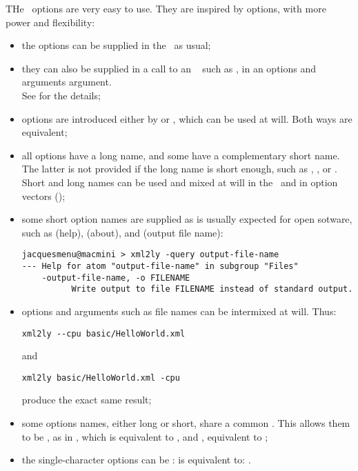 THe \oahRepr\ options are very easy to use. They are inspired by  options, with more power and flexibility:
\begin{itemize}
\item the options can be supplied in the \CLI\ as usual;

  \item they can also be supplied in a call to an \API\  such as , in an options and arguments argument. \\
    		See  for the details;

\item options are introduced either by \code{-} or \code{--}, which can be used at will. Both ways are equivalent;

\item all options have a long name, and some have a complementary short name.
 The latter is not provided if the long name is short enough, such as , ,  or .\\
    Short and long names can be used and mixed at will in the \CLI\ and in option vectors (\API);

\item some short option names are supplied as is usually expected for open sotware, such as  (help),  (about), and  (output file name):
\begin{lstlisting}[language=Terminal]
jacquesmenu@macmini > xml2ly -query output-file-name
--- Help for atom "output-file-name" in subgroup "Files"
    -output-file-name, -o FILENAME
          Write output to file FILENAME instead of standard output.
\end{lstlisting}

\item options and arguments such as file names can be intermixed at will. Thus:
\begin{lstlisting}[language=Terminal]
xml2ly --cpu basic/HelloWorld.xml
\end{lstlisting}
and
\begin{lstlisting}[language=Terminal]
xml2ly basic/HelloWorld.xml -cpu
\end{lstlisting}

produce the exact same result;

\item some options names, either long or short, share a common . This allows them to be , as in , which is equivalent to , and , equivalent to ;

\item the single-character options can be :  is equivalent to: .

\end{itemize}


